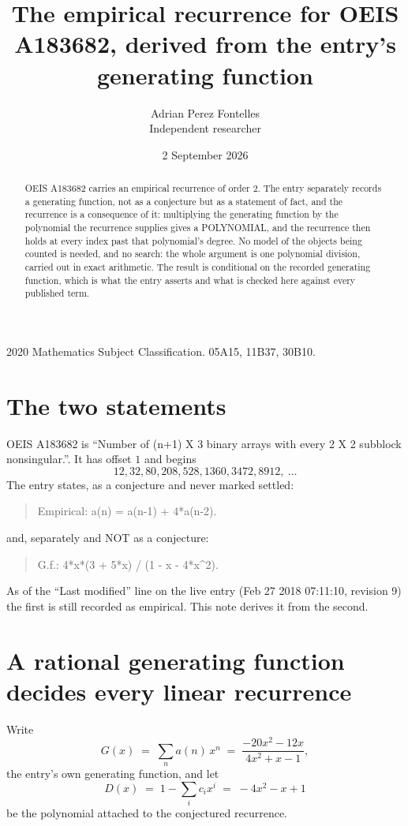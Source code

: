 \documentclass[11pt,a4paper]{article}
\title{The empirical recurrence for OEIS A183682, derived from the entry's generating function}
\author{Adrian Perez Fontelles\\ \small Independent researcher}
\date{2 September 2026}
\theoremstyle{plain}
\theoremstyle{definition}
\begin{document}
\maketitle

\begin{abstract}
OEIS A183682 carries an empirical recurrence of order $2$. The entry separately records a
generating function, not as a conjecture but as a statement of fact, and the recurrence is a
consequence of it: multiplying the generating function by the polynomial the recurrence
supplies gives a POLYNOMIAL, and the recurrence then holds at every index past that
polynomial's degree. No model of the objects being counted is needed, and no search: the
whole argument is one polynomial division, carried out in exact arithmetic. The result is
conditional on the recorded generating function, which is what the entry asserts and what is
checked here against every published term.
\end{abstract}

\noindent\small 2020 Mathematics Subject Classification. 05A15, 11B37, 30B10.\normalsize

\section{The two statements}

OEIS A183682 is ``Number of (n+1) X 3 binary arrays with every 2 X 2 subblock nonsingular.''. It has offset $1$ and begins
\[
12, 32, 80, 208, 528, 1360, 3472, 8912,\ \dots
\]
The entry states, as a conjecture and never marked settled:
\begin{quote}
Empirical: a(n) = a(n-1) + 4*a(n-2).
\end{quote}
and, separately and NOT as a conjecture:
\begin{quote}
G.f.: 4*x*(3 + 5*x) / (1 - x - 4*x\^{}2).
\end{quote}
As of the ``Last modified'' line on the live entry (Feb 27 2018 07:11:10, revision 9) the first is still
recorded as empirical. This note derives it from the second.

\section{A rational generating function decides every linear recurrence}

Write
\[
G(x)\;=\;\sum_{n}a(n)\,x^{n}\;=\;\frac{- 20 x^{2} - 12 x}{4 x^{2} + x - 1},
\]
the entry's own generating function, and let
\[
D(x)\;=\;1-\sum_i c_i x^{i}\;=\;- 4 x^{2} - x + 1
\]
be the polynomial attached to the conjectured recurrence.
\end{document}
